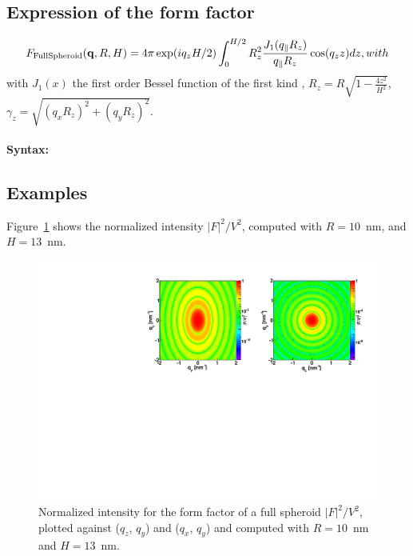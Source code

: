\subsection{Expression of the form factor}
\begin{equation*}
F_{\rm{FullSpheroid}}(\mathbf{q}, R, H) = 4\pi \exp(i q_z H/2) \int_0 ^{H/2}R_z ^2
\frac{J_1(q_{\parallel}R_z)}{q_{\parallel}R_z} \cos(q_z z) dz,
with 
\end{equation*}
with $J_1(x)$ the first order
Bessel function of the first kind \cite{AbSt64},
$R_z = R\sqrt{1-\frac{4z^2}{H^2}}$, $\gamma_z = \sqrt{(q_x R_z)^2+(q_y R_z)^2}$.


\paragraph{Syntax:} 

\subsection{Examples}
Figure~\ref{fig:FFfspheroidEx} shows the normalized intensity
$|F|^2/V^2$, computed with $R=10$~nm, and $H=13$~nm.
\begin{figure}[h]
\begin{center}
\includegraphics[width=\textwidth]{Figures/figfffspheroid}
\end{center}
\caption{Normalized intensity for the form factor of a full spheroid
  $|F|^2/V^2$, plotted against ($q_z$, $q_y$) and ($q_x$, $q_y$) and
  computed with $R=10$~nm and $H=13$~nm.}
\label{fig:FFfspheroidEx}
\end{figure}

